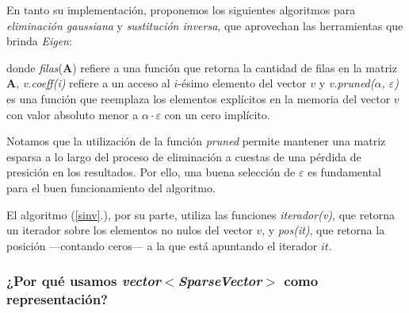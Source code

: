\vspace{1em}
En tanto su implementación, proponemos los siguientes algoritmos para \textit{eliminación gaussiana} y \textit{sustitución inversa}, que aprovechan las herramientas que brinda \textit{Eigen}:

\vspace{1em}


\vspace{1em}
\noindent donde \textit{filas}(\textbf{A}) refiere a una función que retorna la cantidad de filas en la matriz \textbf{A}, \textit{v.coeff(i)} refiere a un acceso al $i$-ésimo elemento del vector $v$ y \textit{v.pruned($\alpha$, $\varepsilon$)} es una función que reemplaza los elementos explícitos en la memoria del vector $v$ con valor absoluto menor a $\alpha \cdot \varepsilon$ con un cero implícito.

\vspace{1em}
Notamos que la utilización de la función \textit{pruned} permite mantener una matriz esparsa a lo largo del proceso de eliminación a cuestas de una pérdida de presición en los resultados. Por ello, una buena selección de $\varepsilon$ es fundamental para el buen funcionamiento del algoritmo. 

\vspace{1em}
\noindent %

\vspace{1em}


\vspace{1em}
El algoritmo (\ref{sinv}.), por su parte, utiliza las funciones \textit{iterador(v)}, que retorna un iterador sobre los elementos no nulos del vector $v$, y \textit{pos(it)}, que retorna la posición ---contando ceros--- a la que está apuntando el iterador $it$. 




\vspace{2em}
\subsubsection{¿Por qué usamos \textit{vector$<$SparseVector$>$} como representación?}\label{representacion}

